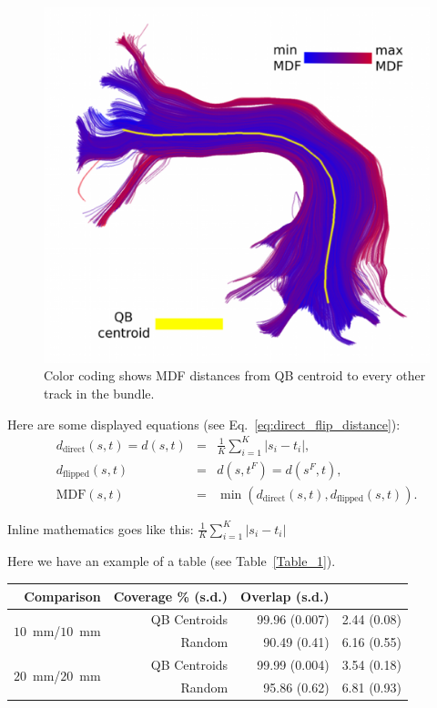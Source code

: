 \documentclass{bioinfo}
\begin{document}
\begin{figure}
\includegraphics[scale=0.15]{Figures/Fig_11_MDF_arcuate}
\centering{}
\caption{Color coding shows MDF distances from QB centroid to every
  other track in the bundle.\label{Fig:little_picture}}
\end{figure}

Here are some displayed equations (see Eq.~\ref{eq:direct_flip_distance}):
\begin{eqnarray}
  d_{\textrm{direct}}(s, t) = d(s, t) & = & \frac{1}{K}\sum_{i=1}^{K}|s_{i}-t_{i}|,\nonumber\\
  d_{\textrm{flipped}}(s, t) & = & d(s,t^F) = d(s^F,t),\nonumber\\
  \textrm{MDF}(s, t) & = & \min(d_{\textrm{direct}}(s, t), d_{\textrm{flipped}}(s, t))\label{eq:direct_flip_distance}.
\end{eqnarray}

Inline mathematics goes like this: $\frac{1}{K}\sum_{i=1}^{K}|s_{i}-t_{i}|$

Here we have an example of a table (see Table~\ref{Table_1}).

\begin{table}[th]  {\begin{tabular}{rrrr} %
Comparison & Coverage \% (s.d.) & Overlap (s.d.) \\ \hline
\multirow{2}{*}{$10$~mm/$10$~mm} & QB Centroids & 99.96 (0.007) & 2.44
(0.08)\\ & Random & 90.49 (0.41) & 6.16 (0.55)\\ \hline
\multirow{2}{*}{$20$~mm/$20$~mm} & QB Centroids & 99.99 (0.004) & 3.54
(0.18)\\ & Random & 95.86 (0.62) & 6.81 (0.93)\\ \hline
\end{tabular}}{}
\end{table}
\end{document}
